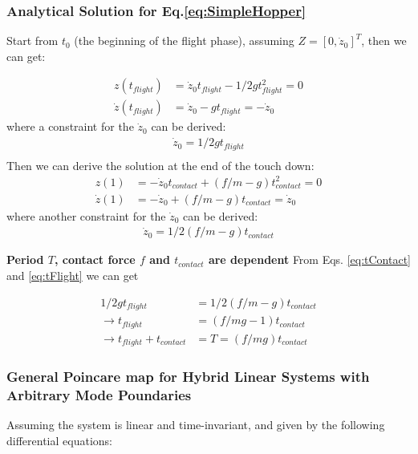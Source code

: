 \subsubsection{Analytical Solution for Eq.\ref{eq:SimpleHopper}}
Start from $t_0$ (the beginning of the flight phase), assuming $Z = [0, \dot z_0]^T$, then we can get:

\begin{align}
z(t_{flight}) &= \dot z_0t_{flight} - 1/2gt^2_{flight} = 0\\
\dot z(t_{flight}) &= \dot z_0 - gt_{flight} = -\dot z_0
\end{align}
where a constraint for the $\dot z_0$ can be derived:
\begin{align}
\label{eq:tFlight}
\dot z_0 =  1/2gt_{flight}\\
\end{align}
Then we can derive the solution at the end of the touch down:
\begin{align}
z(1) &= -\dot z_0t_{contact} + (f/m -g)t_{contact}^2 = 0 \\
\dot z(1) &= -\dot z_0 + (f/m -g)t_{contact} = \dot z_0
\end{align}
where another constraint for the $\dot z_0$ can be derived:
\begin{align}
\label{eq:tContact}
\dot z_0 =  1/2(f/m-g)t_{contact}
\end{align}

\noindent \textbf{Period $T$, contact force $f$ and $t_{contact}$ are dependent }
From Eqs. \ref{eq:tContact} and \ref{eq:tFlight} we can get

\begin{align*}
1/2gt_{flight} &=  1/2(f/m-g)t_{contact}\\
\rightarrow t_{flight} &= (f/mg -1) t_{contact}\\
\rightarrow t_{flight} + t_{contact} &= T = (f/mg)t_{contact}
\end{align*}

\pagebreak

\subsubsection{General Poincare map for Hybrid Linear Systems with Arbitrary Mode Poundaries}
Assuming the system is linear and time-invariant, and given by the following differential equations:


